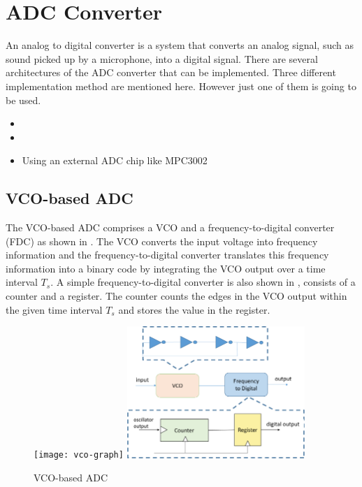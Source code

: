 \documentclass[12pt, logo=tehranDLDL/ut]{tehranDLDL}
\begin{document}
\section{ADC Converter\label{sec:adc}}

An analog to digital converter is a system that converts an analog signal, such as sound picked up by a microphone, into a digital signal. There are several architectures of the ADC converter that can be implemented. Three different implementation method are mentioned here. However just one of them is going to be used.

\begin{itemize}
    \item {}
    \item {}
    \item Using an external ADC chip like MPC3002
\end{itemize}

\subsection{VCO-based ADC\label{sec:vco-based-adc}}

The VCO-based ADC comprises a VCO and a frequency-to-digital converter (FDC) as shown in . The VCO converts the input voltage into frequency information and the frequency-to-digital converter translates this frequency information into a binary code by integrating the VCO output over a time interval $T_s$. A simple frequency-to-digital converter is also shown in , consists of a counter and a register. The counter counts the edges in the VCO output within the given time interval $T_s$ and stores the value in the register.

\begin{figure}
    \centering
    \caption{VCO-based ADC\label{fig:vco-based-adc}}
    \texttt{[image: vco-graph]}
    \includegraphics[width=0.6\textwidth]{vco}
\end{figure}
\end{document}
